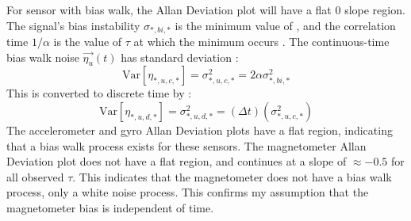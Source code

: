 \documentclass[conference]{IEEEtran}
\newcommand{\Var}{\mathrm{Var}}
\begin{document}
For sensor with bias walk, the Allan Deviation plot will have a flat $0$ slope region. The signal's bias instability $\sigma_{*,bi,*}$ is the minimum value of , and the correlation time $1/\alpha$ is the value of $\tau$ at which the minimum occurs \cite{UCAM-CL-TR-696}. The continuous-time bias walk noise $\vec{\eta_u}(t)$ has standard deviation \cite{1642588}:
\begin{equation}
    \Var[\eta_{*,u,c,*}] = \sigma_{*,u,c,*}^2 = 2 \alpha \sigma_{*,bi,*}^2
\end{equation}
This is converted to discrete time by \cite{1642588}:
\begin{equation}
    \Var[\eta_{*,u,d,*}] = \sigma_{*,u,d,*}^2 = (\Delta t) (\sigma_{*,u,c,*}^2)
\end{equation}
The accelerometer and gyro Allan Deviation plots have a flat region, indicating that a bias walk process exists for these sensors. The magnetometer Allan Deviation plot does not have a flat region, and continues at a slope of $\approx -0.5$ for all observed $\tau$. This indicates that the magnetometer does not have a bias walk process, only a white noise process. This confirms my assumption that the magnetometer bias is independent of time.
\end{document}
